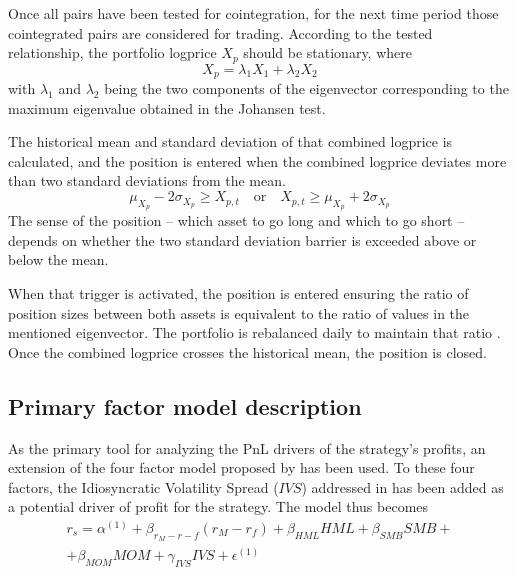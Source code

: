 Once all pairs have been tested for cointegration, for the next time period those cointegrated pairs are considered for trading. According to the tested relationship, the portfolio logprice $X_p$ should be stationary, where
\begin{equation}
    X_p = \lambda_1 X_1 + \lambda_2 X_2
\end{equation}
with $\lambda_1$ and $\lambda_2$ being the two components of the eigenvector corresponding to the maximum eigenvalue obtained in the Johansen test.

The historical mean and standard deviation of that combined logprice is calculated, and the position is entered when the combined logprice deviates more than two standard deviations from the mean. 
\begin{equation}
    \mu_{X_p} - 2\sigma_{X_p} \geq X_{p,t} \quad \text{or} \quad X_{p,t} \geq \mu_{X_p} + 2\sigma_{X_p}
\end{equation}
The sense of the position -- which asset to go long and which to go short -- depends on whether the two standard deviation barrier is exceeded above or below the mean.

When that trigger is activated, the position is entered ensuring the ratio of position sizes between both assets is equivalent to the ratio of values in the mentioned eigenvector. The portfolio is rebalanced daily to maintain that ratio \cite{chan_2013}.
Once the combined logprice crosses the historical mean, the position is closed. 

\subsection{Primary factor model description}
As the primary tool for analyzing the PnL drivers of the strategy's profits, an extension of the four factor model proposed by \cite{carhart_1997} has been used. To these four factors, the Idiosyncratic Volatility Spread ($IVS$) addressed in \cite{ioannis_2024} has been added as a potential driver of profit for the strategy. The model thus becomes
\begin{multline}
    \label{e:primary-regression}
    r_s = \alpha^{(1)} + \beta_{r_M-r-f}(r_M-r_f) + \beta_{HML}HML + \beta_{SMB}SMB + \\ + \beta_{MOM}MOM+ \gamma_{IVS}IVS + \epsilon^{(1)}
\end{multline}

